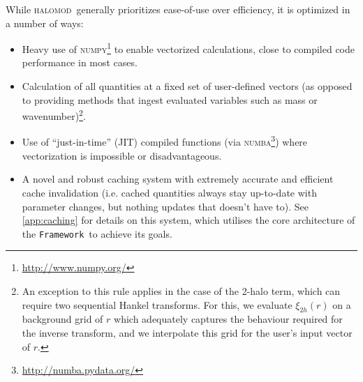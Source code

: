\documentclass[5p,aas_macros]{elsarticle}
\newcommand{\halomod}{\textsc{halomod}\xspace} %
\newcommand{\framework}{\texttt{Framework}\xspace} %
\begin{document}
While \halomod\ generally prioritizes ease-of-use over efficiency, it is optimized in a number of ways:
\begin{itemize}
    \item Heavy use of \textsc{numpy}\footnote{\url{http://www.numpy.org/}} to enable vectorized calculations, close to compiled code performance in most cases.
    \item Calculation of all quantities at a fixed set of user-defined vectors (as opposed to providing methods that ingest evaluated variables such as mass or wavenumber)\footnote{An exception to this rule applies in the case of the 2-halo term, which can require two sequential Hankel transforms. For this, we evaluate $\xi_{2h}(r)$ on a background grid of $r$ which adequately captures the behaviour required for the inverse transform, and we interpolate this grid for the user's input vector of $r$.}.
    \item Use of ``just-in-time'' (JIT) compiled functions (via \textsc{numba}\footnote{\url{http://numba.pydata.org/}}) where vectorization is impossible or disadvantageous.
    \item A novel and robust caching system with extremely accurate and efficient cache invalidation (i.e. cached quantities always stay up-to-date with parameter changes, but nothing updates that doesn't have to). See \ref{app:caching} for details on this system, which utilises the core architecture of the \framework\ to achieve its goals.
\end{itemize}


\end{document}
